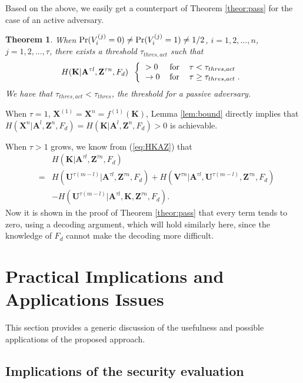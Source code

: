 \documentclass{article}[11pt]
\newcommand{\am}{\mathbf{A}}
\newcommand{\km}{\mathbf{K}}
\newcommand{\um}{\mathbf{U}}
\newcommand{\vm}{\mathbf{V}}
\newcommand{\xm}{\mathbf{X}}
\newcommand{\zm}{\mathbf{Z}}
\newtheorem{theor}{Theorem}
\newenvironment{proof}{\noindent {\bf Proof. \ }}{\hfill \vrule height 2pt depth 4pt width 6pt\par\noindent}
\begin{document}
Based on the above, we easily get a counterpart of Theorem \ref{theor:pass} for the case of an active adversary.

\begin{theor}\label{theor:act}
When ${\rm Pr}(V_i^{(j)}=0) \neq {\rm Pr}(V_i^{(j)}=1) \neq 1/2$,
$i=1,2,...,n$, $j=1,2,...,\tau$, there exists a threshold $\tau_{thres,act}$
such that
\[
H(\km|\am^{\tau l},\zm^{\tau n},F_d) \;\;
\left\{ \begin{tabular}{lll}
$> 0$ & {\rm for} & $\tau < \tau_{thres,act}$ \\
$\rightarrow 0$   & {\rm for} & $\tau \geq \tau_{thres,act} \;.$\\
\end{tabular}\right.
\]
We have that $\tau_{thres,act}<\tau_{thres}$, the threshold for a passive adversary.
\end{theor}

\begin{proof}
When $\tau = 1$, $\xm^{(1)}=\xm^n =f^{(1)}(\km)$, Lemma \ref{lem:bound}
directly implies that $H(\xm^n|\am^l,\zm^n,F_d)=H(\km|\am^{l},\zm^{n},F_d) > 0$ is
achievable.

When $\tau > 1$ grows, we know from (\ref{eq:HKAZ}) that
\begin{eqnarray}
&&H(\km|\am^{\tau l},\zm^{\tau n},F_d)\nonumber \\
&=& H(\um^{\tau(m-l)}|\am^{\tau l},\zm^{\tau n},F_d) +
   H(\vm^{\tau n}|\am^{\tau l},\um^{\tau(m-l)},\zm^{\tau n},F_d)\nonumber \\
&& -H(\um^{\tau(m-l)}|\am^{\tau l},\km,\zm^{\tau n},F_d).
\end{eqnarray}
Now it is shown in the proof of Theorem \ref{theor:pass} that every term tends to zero,
using a decoding argument, which will hold similarly here, since the knowledge of $F_d$
cannot make the decoding more difficult.
\end{proof}



\section{Practical Implications and Applications Issues}
\label{sec:appli}

This section provides a generic discussion of the usefulness and
possible applications of the proposed approach.

\subsection{Implications of the security evaluation}
\end{document}
